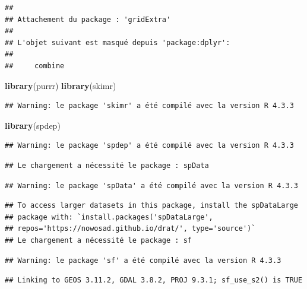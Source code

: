 \documentclass[
]{article}
\newenvironment{Shaded}{\begin{snugshade}}{\end{snugshade}}
\newcommand{\FunctionTok}[1]{\textcolor[rgb]{0.13,0.29,0.53}{\textbf{#1}}}
\newcommand{\NormalTok}[1]{#1}
\begin{document}
\begin{verbatim}
## 
## Attachement du package : 'gridExtra'
## 
## L'objet suivant est masqué depuis 'package:dplyr':
## 
##     combine
\end{verbatim}

\begin{Shaded}
\begin{Highlighting}[]
\FunctionTok{library}\NormalTok{(purrr)}
\FunctionTok{library}\NormalTok{(skimr)}
\end{Highlighting}
\end{Shaded}

\begin{verbatim}
## Warning: le package 'skimr' a été compilé avec la version R 4.3.3
\end{verbatim}

\begin{Shaded}
\begin{Highlighting}[]
\FunctionTok{library}\NormalTok{(spdep)}
\end{Highlighting}
\end{Shaded}

\begin{verbatim}
## Warning: le package 'spdep' a été compilé avec la version R 4.3.3
\end{verbatim}

\begin{verbatim}
## Le chargement a nécessité le package : spData
\end{verbatim}

\begin{verbatim}
## Warning: le package 'spData' a été compilé avec la version R 4.3.3
\end{verbatim}

\begin{verbatim}
## To access larger datasets in this package, install the spDataLarge
## package with: `install.packages('spDataLarge',
## repos='https://nowosad.github.io/drat/', type='source')`
## Le chargement a nécessité le package : sf
\end{verbatim}

\begin{verbatim}
## Warning: le package 'sf' a été compilé avec la version R 4.3.3
\end{verbatim}

\begin{verbatim}
## Linking to GEOS 3.11.2, GDAL 3.8.2, PROJ 9.3.1; sf_use_s2() is TRUE
\end{verbatim}
\end{document}
